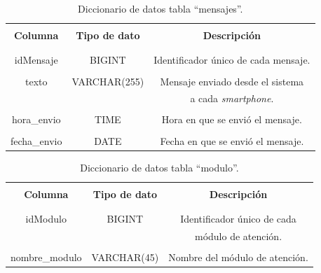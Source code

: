 \begin{spacing}{1.0}
	\begin{table}[H]
		\centering
		\caption{Diccionario de datos tabla ``mensajes''.} 
		\begin{tabular}{|c|c|c|}
			\hline 
			\rowcolor{gray!30} &&\\
			\rowcolor{gray!30} \textbf{Columna} & \textbf{Tipo de dato} & \textbf{Descripción} \\ 
			\rowcolor{gray!30} &&\\
			\hline 
			&&\\[-0.2cm]
			idMensaje & BIGINT & Identificador único de cada mensaje. \\
			\hline 
			&&\\[-0.2cm]
			texto & VARCHAR(255) & Mensaje enviado desde el sistema \\
			 & & a cada \textit{smartphone}. \\
			\hline 
			&&\\[-0.2cm]
			hora\_envio & TIME & Hora en que se envió el mensaje. \\
			\hline 
			&&\\[-0.2cm]
			fecha\_envio & DATE & Fecha en que se envió el mensaje. \\
			\hline
		\end{tabular}
		\label{diccionario_mensajes}
	\end{table}
\end{spacing}

\begin{spacing}{1.0}
	\begin{table}[H]
		\centering
		\caption{Diccionario de datos tabla ``modulo''.} 
		\begin{tabular}{|c|c|c|}
			\hline 
			\rowcolor{gray!30} &&\\
			\rowcolor{gray!30} \textbf{Columna} & \textbf{Tipo de dato} & \textbf{Descripción} \\ 
			\rowcolor{gray!30} &&\\
			\hline 
			&&\\[-0.2cm]
			idModulo & BIGINT & Identificador único de cada \\
			 & & módulo de atención. \\
			\hline 
			&&\\[-0.2cm]
			nombre\_modulo & VARCHAR(45) & Nombre del módulo de atención. \\
			\hline 
		\end{tabular}
		\label{diccionario_modulo}
	\end{table}
\end{spacing}

